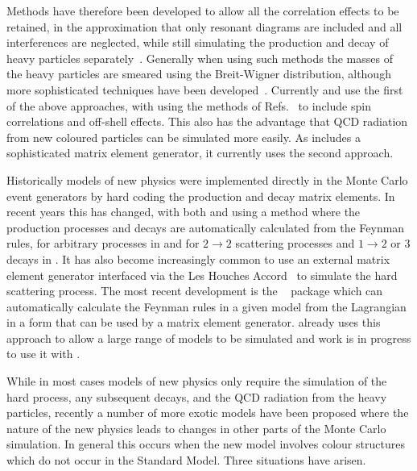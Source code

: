   Methods have therefore been developed to allow all the correlation 
  effects to be retained, in the approximation that only resonant diagrams
  are included and all interferences are neglected, while still simulating
  the production and decay of heavy particles 
  separately~\cite{Collins:1987cp,Knowles:1987cu,Knowles:1988hu,Knowles:1988vs,Richardson:2001df}. Generally
  when using such methods the masses of the heavy particles
  are smeared using the Breit-Wigner distribution, although more sophisticated
  techniques have been developed~\cite{Gigg:2008yc}. Currently \herwigpp and \pythiaeight use
  the first of the above approaches, with \herwigpp using the methods of
  Refs.~\cite{Richardson:2001df,Gigg:2007cr,Gigg:2008yc} 
  to include spin correlations and off-shell effects.
  This also has the advantage that QCD radiation from new coloured
  particles can be simulated more easily.
  As \sherpa includes
  a sophisticated matrix element generator, it currently uses the second approach.

  Historically models of new physics were implemented directly in the Monte Carlo
  event generators by hard coding the production and decay matrix elements.
  In recent years this has changed, with both \sherpa and \herwigpp using a method
  where the production processes and decays are automatically calculated from
  the Feynman rules, for arbitrary processes in \sherpa and for $2\to2$ scattering
  processes and $1\to2$ or 3 decays in \herwigpp. It has also become increasingly
  common to use an external matrix element generator interfaced via the Les
  Houches Accord~\cite{Boos:2001cv,Alwall:2006yp}
  to simulate the hard scattering process. The most recent 
  development is the \FeynRules~\cite{Christensen:2008py} package which
  can automatically calculate the Feynman rules in a given model from the Lagrangian
  in a form that can be used by a matrix element generator. \sherpa already uses
  this approach to allow a large range of models to be simulated and work is
  in progress to use it with \herwigpp.

  While in most cases models of new physics only require the simulation of
  the hard process, any subsequent decays, and the QCD radiation from the heavy particles,
  recently a number of more exotic models have been proposed where
  the nature of the new physics leads to changes in other parts of the Monte
  Carlo simulation. In general this occurs when the new model involves colour 
  structures which do not occur in the Standard Model. 
  Three situations have arisen.

